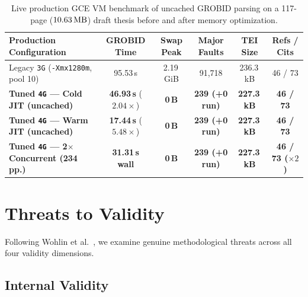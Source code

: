 {\setlength{\tabcolsep}{3.5pt}
\begin{table}[!htbp]
\centering
\caption{Live production GCE VM benchmark of uncached GROBID parsing on a 117-page ($10.63\text{\,MB}$) draft thesis before and after memory optimization.}\label{tab:nfr-grobid-prod}
\begin{tabular}{|L{0.28}|C{0.15}|C{0.13}|C{0.16}|C{0.13}|C{0.15}|}
\hline
\textbf{Production Configuration} & \textbf{GROBID Time} & \textbf{Swap Peak} & \textbf{Major Faults} & \textbf{TEI Size} & \textbf{Refs / Cits} \\
\hline
Legacy \texttt{3G} (\texttt{-Xmx1280m}, pool 10) & 95.53\,s & 2.19\,GiB & 91,718 & 236.3\,kB & 46 / 73 \\
\hline
\textbf{Tuned \texttt{4G} --- Cold JIT (uncached)} & \textbf{46.93\,s} ($2.04\times$) & \textbf{0\,B} & \textbf{239 (+0 run)} & \textbf{227.3\,kB} & \textbf{46 / 73} \\
\hline
\textbf{Tuned \texttt{4G} --- Warm JIT (uncached)} & \textbf{17.44\,s} ($5.48\times$) & \textbf{0\,B} & \textbf{239 (+0 run)} & \textbf{227.3\,kB} & \textbf{46 / 73} \\
\hline
\textbf{Tuned \texttt{4G} --- 2$\times$ Concurrent (234\,pp.)} & \textbf{31.31\,s wall} & \textbf{0\,B} & \textbf{239 (+0 run)} & \textbf{227.3\,kB} & \textbf{46 / 73 ($\times 2$)} \\
\hline
\end{tabular}
\end{table}
}


\section{Threats to Validity}
\label{sec:difficulties}

Following Wohlin et al.~\cite{wohlin2012experimentation}, we examine genuine methodological threats across all four validity dimensions.

\subsection{Internal Validity}

